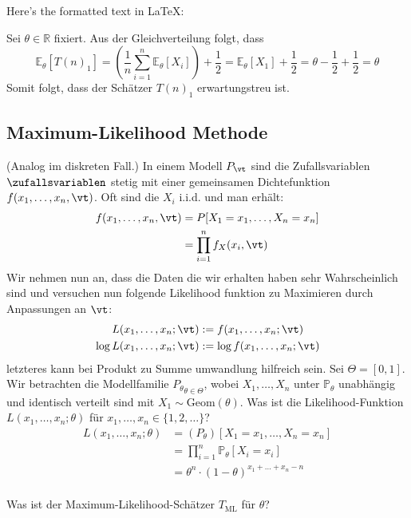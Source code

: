 Here's the formatted text in LaTeX:

Sei $\theta \in \mathbb{R}$ fixiert. Aus der Gleichverteilung folgt, dass
\[
\mathbb{E}_{\theta}[T(n)_1] = \left(\frac{1}{n} \sum_{i=1}^{n} \mathbb{E}_{\theta}[X_i]\right) + \frac{1}{2} = \mathbb{E}_{\theta}[X_1] + \frac{1}{2} = \theta - \frac{1}{2} + \frac{1}{2} = \theta
\]
Somit folgt, dass der Schätzer $T(n)_1$ erwartungstreu ist.

\BoxEnd{}
\subsection*{Maximum-Likelihood Methode}
(Analog im diskreten Fall.) In einem Modell $P_\vt$ sind die Zufallsvariablen
$\zufallsvariablen$ stetig mit einer gemeinsamen Dichtefunktion
$f (x_1, \dots, x_n, \vt)$. Oft sind die $X_i$ i.i.d. und man erhält:
\begin{align*}
  f (x_1, \dots, x_n, \vt) & = P[X_1 = x_1, \dots, X_n = x_n] \\
                           & = \prod_{i = 1}^n f_X (x_i, \vt)
\end{align*}
Wir nehmen nun an, dass die Daten die wir erhalten haben sehr
Wahrscheinlich sind und versuchen nun folgende Likelihood funktion
zu Maximieren durch Anpassungen an $\vt$:
\begin{align*}
  L (x_1, \dots, x_n; \vt)      & := f (x_1, \dots, x_n; \vt)      \\
  \log L (x_1, \dots, x_n; \vt) & := \log f (x_1, \dots, x_n; \vt)
\end{align*}
letzteres kann bei Produkt zu Summe umwandlung hilfreich sein.
\BoxStart{}
Sei $\Theta = [0, 1]$. Wir betrachten die Modellfamilie $ {P_\theta}_{\theta \in \Theta}$, wobei $X_1, \ldots, X_n$ unter $\mathbb{P}_\theta$ unabhängig und identisch verteilt sind mit $X_1 \sim \text{Geom} (\theta)$. Was ist die Likelihood-Funktion $L (x_1, \ldots, x_n; \theta)$ für $x_1, \ldots, x_n \in \{1, 2, \ldots\}$?
\begin{align*}
  L (x_1, \ldots, x_n; \theta) & =  (P_\theta) [X_1 = x_1,\ldots , X_n = x_n]            \\
                               & =\prod_{i = 1}^n \mathbb{P}_\theta[X_i = x_i]           \\
                               & = \theta^n \cdot  (1 - \theta)^{x_1 + \ldots + x_n - n}
\end{align*}
\\
Was ist der Maximum-Likelihood-Schätzer $T_{\text{ML}}$ für $\theta$?


